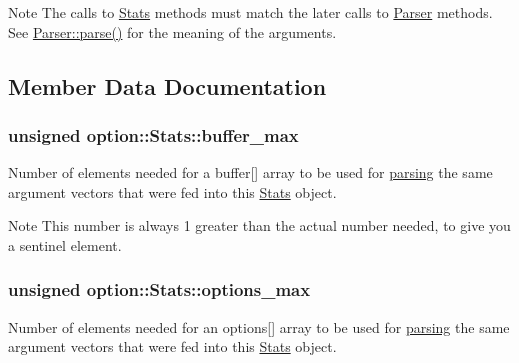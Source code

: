 \begin{DoxyNote}{Note}
The calls to \hyperlink{structoption_1_1Stats}{Stats} methods must match the later calls to \hyperlink{classoption_1_1Parser}{Parser} methods. See \hyperlink{classoption_1_1Parser_a6e0b5778d1cfbd6cd51240e74d01e138}{Parser\+::parse()} for the meaning of the arguments. 
\end{DoxyNote}


\subsection{Member Data Documentation}
\subsubsection[{\texorpdfstring{buffer\+\_\+max}{buffer_max}}]{\setlength{\rightskip}{0pt plus 5cm}unsigned option\+::\+Stats\+::buffer\+\_\+max}\hypertarget{structoption_1_1Stats_a2c9a7b4174f91ba8bcadaa9ad6f0db06}{}\label{structoption_1_1Stats_a2c9a7b4174f91ba8bcadaa9ad6f0db06}


Number of elements needed for a {\ttfamily buffer}\mbox{[}\mbox{]} array to be used for \hyperlink{classoption_1_1Parser_a6e0b5778d1cfbd6cd51240e74d01e138}{parsing} the same argument vectors that were fed into this \hyperlink{structoption_1_1Stats}{Stats} object. 

\begin{DoxyNote}{Note}
This number is always 1 greater than the actual number needed, to give you a sentinel element. 
\end{DoxyNote}
\subsubsection[{\texorpdfstring{options\+\_\+max}{options_max}}]{\setlength{\rightskip}{0pt plus 5cm}unsigned option\+::\+Stats\+::options\+\_\+max}\hypertarget{structoption_1_1Stats_a8121787feb1c7db84fca3ccb012b0473}{}\label{structoption_1_1Stats_a8121787feb1c7db84fca3ccb012b0473}


Number of elements needed for an {\ttfamily options}\mbox{[}\mbox{]} array to be used for \hyperlink{classoption_1_1Parser_a6e0b5778d1cfbd6cd51240e74d01e138}{parsing} the same argument vectors that were fed into this \hyperlink{structoption_1_1Stats}{Stats} object. 

